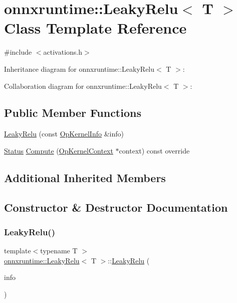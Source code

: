 \hypertarget{classonnxruntime_1_1LeakyRelu}{}\section{onnxruntime\+:\+:Leaky\+Relu$<$ T $>$ Class Template Reference}
\label{classonnxruntime_1_1LeakyRelu}


{\ttfamily \#include $<$activations.\+h$>$}



Inheritance diagram for onnxruntime\+:\+:Leaky\+Relu$<$ T $>$\+:


Collaboration diagram for onnxruntime\+:\+:Leaky\+Relu$<$ T $>$\+:
\subsection*{Public Member Functions}
\begin{DoxyCompactItemize}
\item 
\mbox{\hyperlink{classonnxruntime_1_1LeakyRelu_aacbdf2d77a440b697cd6e36f24c5c61d}{Leaky\+Relu}} (const \mbox{\hyperlink{classonnxruntime_1_1OpKernelInfo}{Op\+Kernel\+Info}} \&info)
\item 
\mbox{\hyperlink{classonnxruntime_1_1common_1_1Status}{Status}} \mbox{\hyperlink{classonnxruntime_1_1LeakyRelu_a8fb7b20882b790aaf44d1ce283992d47}{Compute}} (\mbox{\hyperlink{classonnxruntime_1_1OpKernelContext}{Op\+Kernel\+Context}} $\ast$context) const override
\end{DoxyCompactItemize}
\subsection*{Additional Inherited Members}


\subsection{Constructor \& Destructor Documentation}
\mbox{\label{classonnxruntime_1_1LeakyRelu_aacbdf2d77a440b697cd6e36f24c5c61d}} 
\subsubsection{\texorpdfstring{Leaky\+Relu()}{LeakyRelu()}}
{\footnotesize\ttfamily template$<$typename T $>$ \\
\mbox{\hyperlink{classonnxruntime_1_1LeakyRelu}{onnxruntime\+::\+Leaky\+Relu}}$<$ T $>$\+::\mbox{\hyperlink{classonnxruntime_1_1LeakyRelu}{Leaky\+Relu}} (\begin{DoxyParamCaption}\item[{const \mbox{\hyperlink{classonnxruntime_1_1OpKernelInfo}{Op\+Kernel\+Info}} \&}]{info }\end{DoxyParamCaption})\hspace{0.3cm}{\ttfamily [inline]}}



